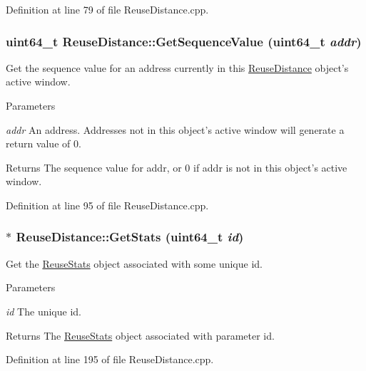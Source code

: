 Definition at line 79 of file ReuseDistance.cpp.

\hypertarget{class_reuse_distance_ac849305d7ca15a5099956d0a89c929a7}{
\subsubsection[{GetSequenceValue}]{\setlength{\rightskip}{0pt plus 5cm}uint64\_\-t ReuseDistance::GetSequenceValue (uint64\_\-t {\em addr})}}
\label{class_reuse_distance_ac849305d7ca15a5099956d0a89c929a7}
Get the sequence value for an address currently in this \hyperlink{class_reuse_distance}{ReuseDistance} object's active window.


\begin{DoxyParams}{Parameters}
\item[{\em addr}]An address. Addresses not in this object's active window will generate a return value of 0.\end{DoxyParams}
\begin{DoxyReturn}{Returns}
The sequence value for addr, or 0 if addr is not in this object's active window. 
\end{DoxyReturn}


Definition at line 95 of file ReuseDistance.cpp.

\hypertarget{class_reuse_distance_a771580c25dc5140969919e959e2ebdd1}{
\subsubsection[{GetStats}]{ $\ast$ ReuseDistance::GetStats (uint64\_\-t {\em id})}}
\label{class_reuse_distance_a771580c25dc5140969919e959e2ebdd1}
Get the \hyperlink{class_reuse_stats}{ReuseStats} object associated with some unique id.


\begin{DoxyParams}{Parameters}
\item[{\em id}]The unique id.\end{DoxyParams}
\begin{DoxyReturn}{Returns}
The \hyperlink{class_reuse_stats}{ReuseStats} object associated with parameter id. 
\end{DoxyReturn}


Definition at line 195 of file ReuseDistance.cpp.

